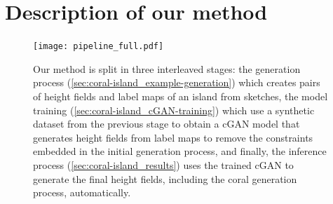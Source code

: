 







\section{Description of our method}
\label{sec:coral-island_method-description}


\begin{figure}[H]
    \texttt{[image: pipeline\_full.pdf]}
    \caption{Our method is split in three interleaved stages: the generation process (\cref{sec:coral-island_example-generation}) which creates pairs of height fields and label maps of an island from sketches, the model training (\cref{sec:coral-island_cGAN-training}) which use a synthetic dataset from the previous stage to obtain a cGAN model that generates height fields from label maps to remove the constraints embedded in the initial generation process, and finally, the inference process (\cref{sec:coral-island_results}) uses the trained cGAN to generate the final height fields, including the coral generation process, automatically. }
    \label{fig:coral-island_pipeline}
\end{figure}

